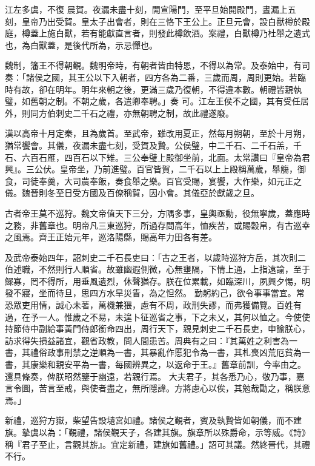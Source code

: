 \begin{pinyinscope}
 江左多虞，不復
 晨賀。夜漏未盡十刻，開宣陽門，至平旦始開殿門，晝漏上五刻，皇帝乃出受賀。皇太子出會者，則在三恪下王公上。正旦元會，設白獸樽於殿庭，樽蓋上施白獸，若有能獻直言者，則發此樽飲酒。案禮，白獸樽乃杜舉之遺式也，為白獸蓋，是後代所為，示忌憚也。



 魏制，籓王不得朝覲。魏明帝時，有朝者皆由特恩，不得以為常。及泰始中，有司奏：「諸侯之國，其王公以下入朝者，四方各為二番，三歲而周，周則更始。若臨時有故，卻在明年。明年來朝之後，更滿三歲乃復朝，不得違本數。朝禮皆親執璧，如舊朝之制。不朝之歲，各遣卿奉聘。」奏
 可。江左王侯不之國，其有受任居外，則同方伯刺史二千石之禮，亦無朝聘之制，故此禮遂廢。



 漢以高帝十月定秦，且為歲首。至武帝，雖改用夏正，然每月朔朝，至於十月朔，猶常饗會。其儀，夜漏未盡七刻，受賀及贄。公侯璧，中二千石、二千石羔，千石、六百石雁，四百石以下雉。三公奉璧上殿御坐前，北面。太常讚曰『皇帝為君興』。三公伏。皇帝坐，乃前進璧。百官皆賀，二千石以上上殿稱萬歲，舉觴，御食，司徒奉羹，大司農奉飯，奏食舉之樂。百官受賜，宴饗，大作樂，如元正之儀。魏晉則冬至日受方國及百僚稱賀，因小會。其儀亞於獻歲之旦。



 古者帝王莫不巡狩。魏文帝值天下三分，方隅多事，皇輿亟動，役無寧歲，蓋應時之務，非舊章也。明帝凡三東巡狩，所過存問高年，恤疾苦，或賜穀帛，有古巡幸之風焉。齊王正始元年，巡洛陽縣，賜高年力田各有差。



 及武帝泰始四年，詔刺史二千石長吏曰：「古之王者，以歲時巡狩方岳，其次則二伯述職，不然則行人順省。故雖幽遐側微，心無壅隔，下情上通，上指遠諭，至于鰥寡，罔不得所，用垂風遺烈，休聲猶存。朕在位累載，如臨深川，夙興夕惕，明發不寢，坐而待旦，思四方水旱災眚，為之怛然。
 勤躬約己，欲令事事當宜。常恐眾吏用情，誠心未著，萬機兼猥，慮有不周，政刑失謬，而弗獲備覽。百姓有過，在予一人。惟歲之不易，未遑卜征巡省之事，下之未乂，其何以恤之。今使使持節侍中副給事黃門侍郎銜命四出，周行天下，親見刺史二千石長吏，申諭朕心，訪求得失損益諸宜，觀省政教，問人間患苦。周典有之曰：『其萬姓之利害為一書，其禮俗政事刑禁之逆順為一書，其暴亂作慝犯令為一書，其札喪凶荒厄貧為一書，其康樂和親安平為一書，每國辨異之，以返命于王。』舊章前訓，今率由之。還具條奏，俾朕昭然鑒于幽遠，若親行焉。
 大夫君子，其各悉乃心，敬乃事，嘉言令圖，苦言至戒，與使者盡之，無所隱諱。方將慮心以俟，其勉哉勖之，稱朕意焉。」



 新禮，巡狩方嶽，柴望告設壝宮如禮。諸侯之覲者，賓及執贄皆如朝儀，而不建旗。摯虞以為：「覲禮，諸侯覲天子，各建其旗。旗章所以殊爵命，示等威。《詩》稱『君子至止，言觀其旂』。宜定新禮，建旗如舊禮。」詔可其議。然終晉代，其禮不行。




\end{pinyinscope}
